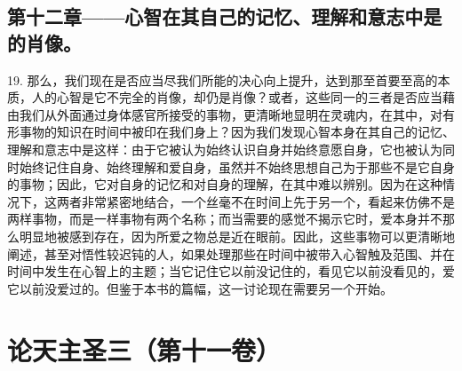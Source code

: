 
\subsection{第十二章——心智在其自己的记忆、理解和意志中是的肖像。}

19. 那么，我们现在是否应当尽我们所能的决心向上提升，达到那至首要至高的本质，人的心智是它不完全的肖像，却仍是肖像？或者，这些同一的三者是否应当藉由我们从外面通过身体感官所接受的事物，更清晰地显明在灵魂内，在其中，对有形事物的知识在时间中被印在我们身上？因为我们发现心智本身在其自己的记忆、理解和意志中是这样：由于它被认为始终认识自身并始终意愿自身，它也被认为同时始终记住自身、始终理解和爱自身，虽然并不始终思想自己为于那些不是它自身的事物；因此，它对自身的记忆和对自身的理解，在其中难以辨别。因为在这种情况下，这两者非常紧密地结合，一个丝毫不在时间上先于另一个，看起来仿佛不是两样事物，而是一样事物有两个名称；而当需要的感觉不揭示它时，爱本身并不那么明显地被感到存在，因为所爱之物总是近在眼前。因此，这些事物可以更清晰地阐述，甚至对悟性较迟钝的人，如果处理那些在时间中被带入心智触及范围、并在时间中发生在心智上的主题；当它记住它以前没记住的，看见它以前没看见的，爱它以前没爱过的。但鉴于本书的篇幅，这一讨论现在需要另一个开始。\par



\section{论天主圣三（第十一卷）}

\par

